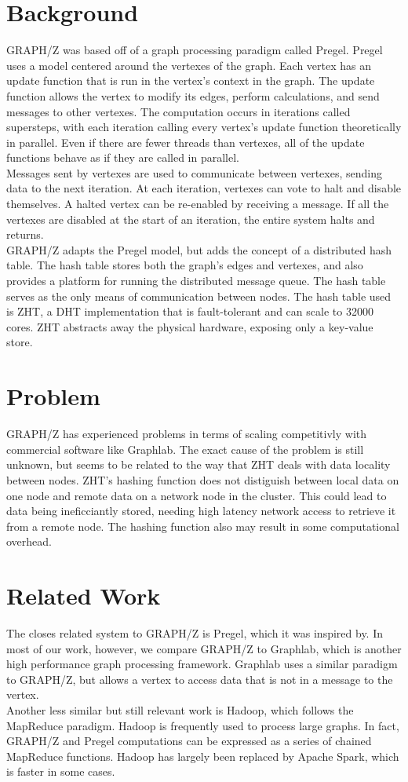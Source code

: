 \documentclass[10pt]{article}
\begin{document}
\begin{multicols}{2} 
  \section{Background}
  GRAPH/Z was based off of a graph processing paradigm called Pregel. Pregel uses a model centered around the vertexes of the graph. Each vertex has an update function that is run in the vertex's context in the graph. The update function allows the vertex to modify its edges, perform calculations, and send messages to other vertexes. The computation occurs in iterations called supersteps, with each iteration calling every vertex's update function theoretically in parallel. Even if there are fewer threads than vertexes, all of the update functions behave as if they are called in parallel.\\
  Messages sent by vertexes are used to communicate between vertexes, sending data to the next iteration. At each iteration, vertexes can vote to halt and disable themselves. A halted vertex can be re-enabled by receiving a message. If all the vertexes are disabled at the start of an iteration, the entire system halts and returns.\\
  GRAPH/Z adapts the Pregel model, but adds the concept of a distributed hash table. The hash table stores both the graph's edges and vertexes, and also provides a platform for running the distributed message queue. The hash table serves as the only means of communication between nodes. The hash table used is ZHT, a DHT implementation that is fault-tolerant and can scale to 32000 cores. ZHT abstracts away the physical hardware, exposing only a key-value store. 
  \section{Problem}
  GRAPH/Z has experienced problems in terms of scaling competitivly with commercial software like Graphlab. The exact cause of the problem is still unknown, but seems to be related to the way that ZHT deals with data locality between nodes. ZHT's hashing function does not distiguish between local data on one node and remote data on a network node in the cluster. This could lead to data being ineficciantly stored, needing high latency network access to retrieve it from a remote node. The hashing function also may result in some computational overhead. 
  \section{Related Work}
  The closes related system to GRAPH/Z is Pregel, which it was inspired by. In most of our work, however, we compare GRAPH/Z to Graphlab, which is another high performance graph processing framework. Graphlab uses a similar paradigm to GRAPH/Z, but allows a vertex to access data that is not in a message to the vertex. \\
  Another less similar but still relevant work is Hadoop, which follows the MapReduce paradigm. Hadoop is frequently used to process large graphs. In fact, GRAPH/Z and Pregel computations can be expressed as a series of chained MapReduce functions. Hadoop has largely been replaced by Apache Spark, which is faster in some cases.    

\end{multicols}
\end{document}
